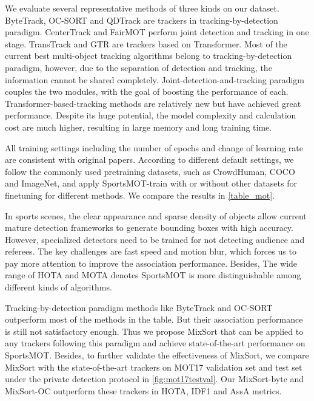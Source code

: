 \documentclass[10pt,twocolumn,letterpaper]{article}
\begin{document}
We evaluate several representative methods of three kinds on our dataset. ByteTrack\cite{zhang2022bytetrack}, OC-SORT\cite{cao2022observation} and QDTrack\cite{pang2021quasi} are trackers in tracking-by-detection paradigm. CenterTrack\cite{zhou2020tracking} and FairMOT\cite{zhang2021fairmot} perform joint detection and tracking in one stage. TransTrack\cite{sun2020transtrack} and GTR\cite{zhou2022global} are trackers based on Transformer. Most of the current best multi-object tracking algorithms belong to tracking-by-detection paradigm, however, due to the separation of detection and tracking, the information cannot be shared completely. Joint-detection-and-tracking paradigm couples the two modules, with the goal of boosting the performance of each. Transformer-based-tracking methods are relatively new but have achieved great performance. Despite its huge potential, the model complexity and calculation cost are much higher, resulting in large memory and long training time.

All training settings including the number of epochs and change of learning rate are consistent with original papers. According to different default settings, we follow the commonly used pretraining datasets, such as CrowdHuman\cite{shao2018crowdhuman}, COCO\cite{lin2014microsoft} and ImageNet\cite{deng2009imagenet}, and apply SportsMOT-train with or without other datasets for finetuning for different methods. We compare the results in \cref{table_mot}.

In sports scenes, the clear appearance and sparse density of objects allow current mature detection frameworks to generate bounding boxes with high accuracy. However, specialized detectors need to be trained for not detecting audience and referees. The key challenges are fast speed and motion blur, which forces us to pay more attention to improve the association performance. Besides, The wide range of HOTA and MOTA denotes SportsMOT is more distinguishable among different kinds of algorithms. 

Tracking-by-detection paradigm methods like ByteTrack and OC-SORT outperform most of the methods in the table. But their association performance is still not satisfactory enough. Thus we propose MixSort that can be applied to any trackers following this paradigm and achieve state-of-the-art performance on SportsMOT.
Besides, to further validate the effectiveness of MixSort, we compare MixSort with the state-of-the-art trackers on MOT17 validation set and test set under the private detection protocol in \cref{fig:mot17testval}. Our MixSort-byte and MixSort-OC outperform these trackers in HOTA, IDF1 and AssA metrics.
\end{document}
